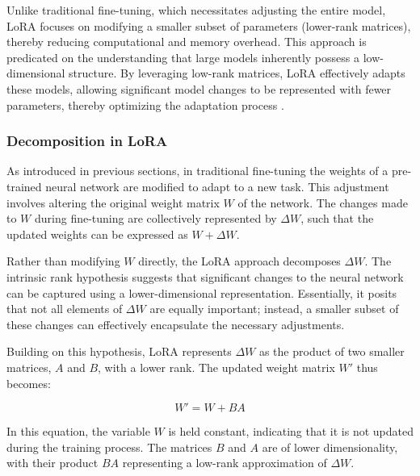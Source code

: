 Unlike traditional fine-tuning, which necessitates adjusting the entire model, LoRA focuses on modifying a smaller subset of parameters (lower-rank matrices), thereby reducing computational and memory overhead. This approach is predicated on the understanding that large models inherently possess a low-dimensional structure. By leveraging low-rank matrices, LoRA effectively adapts these models, allowing significant model changes to be represented with fewer parameters, thereby optimizing the adaptation process \cite{hu2021lora}.

\subsubsection{Decomposition in LoRA}

As introduced in previous sections, in traditional fine-tuning the weights of a pre-trained neural network are modified to adapt to a new task. This adjustment involves altering the original weight matrix \( W \) of the network. The changes made to \( W \) during fine-tuning are collectively represented by \( \Delta W \), such that the updated weights can be expressed as \( W + \Delta W \).

Rather than modifying \( W \) directly, the LoRA approach decomposes \( \Delta W \). The intrinsic rank hypothesis suggests that significant changes to the neural network can be captured using a lower-dimensional representation. Essentially, it posits that not all elements of \( \Delta W \) are equally important; instead, a smaller subset of these changes can effectively encapsulate the necessary adjustments.

Building on this hypothesis, LoRA represents \( \Delta W \) as the product of two smaller matrices, \( A \) and \( B \), with a lower rank. The updated weight matrix \( W' \) thus becomes:

\begin{equation}
    W' = W + BA
\end{equation}

In this equation, the variable \( W \) is held constant, indicating that it is not updated during the training process. The matrices \( B \) and \( A \) are of lower dimensionality, with their product \( BA \) representing a low-rank approximation of \( \Delta W \).

